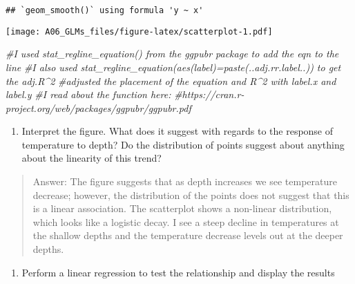 \documentclass[
]{article}
\newenvironment{Shaded}{\begin{snugshade}}{\end{snugshade}}
\newcommand{\CommentTok}[1]{\textcolor[rgb]{0.56,0.35,0.01}{\textit{#1}}}
\newcommand{\FunctionTok}[1]{\textcolor[rgb]{0.00,0.00,0.00}{#1}}
\newcommand{\NormalTok}[1]{#1}
\newcommand{\OtherTok}[1]{\textcolor[rgb]{0.56,0.35,0.01}{#1}}
\newcommand{\SpecialCharTok}[1]{\textcolor[rgb]{0.00,0.00,0.00}{#1}}
\providecommand{\tightlist}{%
  \setlength{\itemsep}{0pt}\setlength{\parskip}{0pt}}
\begin{document}
\begin{verbatim}
## `geom_smooth()` using formula 'y ~ x'
\end{verbatim}

\texttt{[image: A06\_GLMs\_files/figure-latex/scatterplot-1.pdf]}

\begin{Shaded}
\begin{Highlighting}[]
\CommentTok{\#I used stat\_regline\_equation() from the ggpubr package to add the eqn to the line }
\CommentTok{\#I also used stat\_regline\_equation(aes(label)=paste(..adj.rr.label..)) to get the adj.R\^{}2}
\CommentTok{\#adjusted the placement of the equation and R\^{}2 with label.x and label.y}
\CommentTok{\#I read about the function here: }
\CommentTok{\#https://cran.r{-}project.org/web/packages/ggpubr/ggpubr.pdf}
\end{Highlighting}
\end{Shaded}

\begin{enumerate}
\def\labelenumi{\arabic{enumi}.}
\setcounter{enumi}{5}
\tightlist
\item
  Interpret the figure. What does it suggest with regards to the
  response of temperature to depth? Do the distribution of points
  suggest about anything about the linearity of this trend?
\end{enumerate}

\begin{quote}
Answer: The figure suggests that as depth increases we see temperature
decrease; however, the distribution of the points does not suggest that
this is a linear association. The scatterplot shows a non-linear
distribution, which looks like a logistic decay. I see a steep decline
in temperatures at the shallow depths and the temperature decrease
levels out at the deeper depths.
\end{quote}

\begin{enumerate}
\def\labelenumi{\arabic{enumi}.}
\setcounter{enumi}{6}
\tightlist
\item
  Perform a linear regression to test the relationship and display the
  results
\end{enumerate}

\begin{Shaded}
\end{Shaded}
\end{document}
